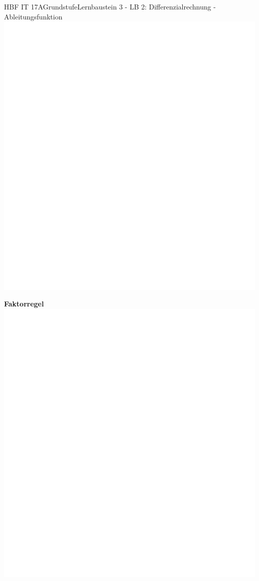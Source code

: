 \documentclass[11pt,twocolumn,oneside,openany,headings=optiontotoc,11pt,numbers=noenddot]{article}
\begin{document}
\begin{worksheet}{HBF IT 17A}{Grundstufe}{Lernbaustein 3 - LB 2: Differenzialrechnung - Ableitungsfunktion}
		\includegraphics[scale=0.1]{../empty.jpg}\\
		\par
		\textbf{Faktorregel}\\
		\includegraphics[scale=0.1]{../empty.jpg}\\

\end{worksheet}
\end{document}

